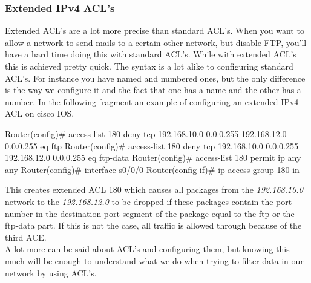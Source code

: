 \subsubsection{Extended IPv4 ACL's}
Extended ACL's are a lot more precise than standard ACL's. When you want to allow a network to send mails to a certain other network, but disable FTP, you'll have a hard time doing this with standard ACL's. While with extended ACL's this is achieved pretty quick. The syntax is a lot alike to configuring standard ACL's. For instance you have named and numbered ones, but the only difference is the way we configure it and the fact that one has a name and the other has a number. In the following fragment an example of configuring an extended IPv4 ACL on cisco IOS.
\begin{cisco}[title=Numbered extended ACL]
Router(config)#  access-list 180 deny tcp 192.168.10.0 0.0.0.255 192.168.12.0 0.0.0.255 eq ftp
Router(config)#  access-list 180 deny tcp 192.168.10.0 0.0.0.255 192.168.12.0 0.0.0.255 eq ftp-data
Router(config)#  access-list 180 permit ip any any
Router(config)#  interface s0/0/0
Router(config-if)#  ip access-group 180 in
\end {cisco}
This creates extended ACL 180 which causes all packages from the \textit{192.168.10.0} network to the \textit{192.168.12.0} to be dropped if these packages contain the port number in the destination port segment of the package equal to the ftp or the ftp-data part. If this is not the case, all traffic is allowed through because of the third ACE.\\

A lot more can be said about ACL's and configuring them, but knowing this much will be enough to understand what we do when trying to filter data in our network by using ACL's.
